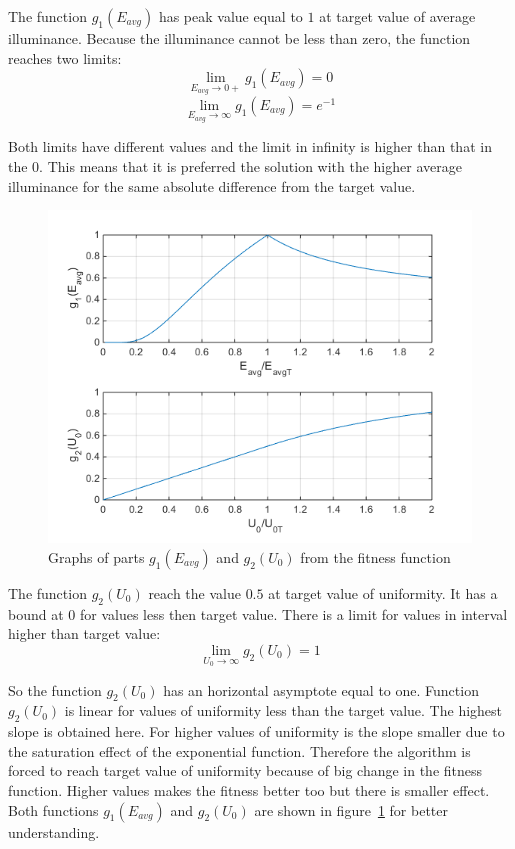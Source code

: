 The function $g_1\left(E_{avg}\right)$ has peak value equal to $1$ at target value of average illuminance. Because the illuminance cannot be less than zero, the function reaches two limits:
\begin{equation}
\label{eq:g1lim0}
\lim_{E_{avg}\to 0+} g_1\left(E_{avg}\right) = 0
\end{equation}
\begin{equation}
\label{eq:g1limInf}
\lim_{E_{avg}\to \infty} g_1\left(E_{avg}\right) = e^{-1}
\end{equation}

Both limits have different values and the limit in infinity is higher than that in the $0$. This means that it is preferred the solution with the higher average illuminance for the same absolute difference from the target value.

\begin{figure}[htb]
  \centering
  \includegraphics[width=\columnwidth]{obrG1G2}
  \caption{Graphs of parts $g_1\left(E_{avg}\right)$ and $g_2\left(U_0\right)$ from the fitness function}
  \label{fig:fitG1G2}
\end{figure}

The function $g_2\left(U_{0}\right)$ reach the value $0.5$ at target value of uniformity. It has a bound at $0$ for values less then target value. There is a limit for values in interval higher than target value:
\begin{equation}
\label{eq:g2limInf}
\lim_{U_{0}\to \infty} g_2\left(U_{0}\right) = 1
\end{equation}

So the function $g_2\left(U_{0}\right)$ has an horizontal asymptote equal to one. Function $g_2\left(U_{0}\right)$ is linear for values of uniformity less than the target value. The highest slope is obtained here. For higher values of uniformity is the slope smaller due to the saturation effect of the exponential function. Therefore the algorithm is forced to reach target value of uniformity because of big change in the fitness function. Higher values makes the fitness better too but there is smaller effect.
Both functions $g_1\left(E_{avg}\right)$ and $g_2\left(U_{0}\right)$ are shown in figure~\ref{fig:fitG1G2} for better understanding.
